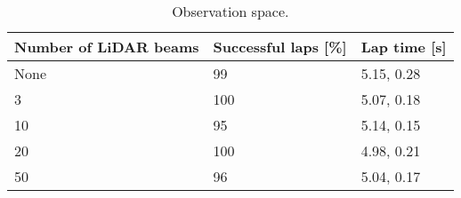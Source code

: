 
\begin{table}[!htb]
\centering
\small
\begin{tabularx}{0.65\textwidth}{RLL} 
    \hline
    \textbf{Number of LiDAR beams} & \textbf{Successful laps [\%]} & \textbf{Lap time [s]}\\ 
    \hline
    None    & 99    & 5.15, 0.28 \\
    3       & 100   & 5.07, 0.18 \\
    10      & 95    & 5.14, 0.15 \\
    20      & 100   & 4.98, 0.21 \\
    50      & 96    & 5.04, 0.17 \\
    \hline
\end{tabularx}
\caption[Observation space]{Observation space.}
\label{tab:observation_space}
\end{table}
